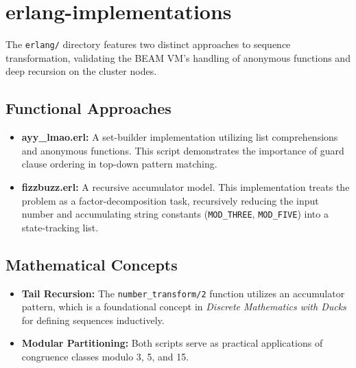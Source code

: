 \section{erlang-implementations}
The \texttt{erlang/} directory features two distinct approaches to sequence transformation, validating the BEAM VM's handling of anonymous functions and deep recursion on the cluster nodes.

\subsection*{Functional Approaches}
\begin{itemize}
    \item \textbf{ayy\_lmao.erl:} A set-builder implementation utilizing list comprehensions and anonymous functions. This script demonstrates the importance of guard clause ordering in top-down pattern matching.
    \item \textbf{fizzbuzz.erl:} A recursive accumulator model. This implementation treats the problem as a factor-decomposition task, recursively reducing the input number and accumulating string constants (\texttt{MOD\_THREE}, \texttt{MOD\_FIVE}) into a state-tracking list.
\end{itemize}

\subsection*{Mathematical Concepts}
\begin{itemize}
    \item \textbf{Tail Recursion:} The \texttt{number\_transform/2} function utilizes an accumulator pattern, which is a foundational concept in \textit{Discrete Mathematics with Ducks} for defining sequences inductively.
    \item \textbf{Modular Partitioning:} Both scripts serve as practical applications of congruence classes modulo 3, 5, and 15.
\end{itemize}